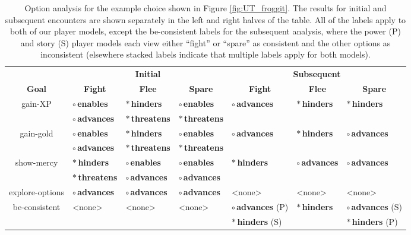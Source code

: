 \documentclass[arts,article,accept,moreauthors,pdftex,10pt,a4paper]{Definitions/mdpi}
\newcommand{\badsym}{$\ast$}
\newcommand{\goodsym}{$\circ$}
\newcommand{\none}{{\sffamily <none>}}
\newcommand{\ncemph}[1]{\textbf{\sffamily #1}}
\newcommand{\enables}{\ncemph{\color{enables}\goodsym{}\,enables}}
\newcommand{\advances}{\ncemph{\color{advances}\goodsym{}\,advances}}
\newcommand{\threatens}{\ncemph{\color{threatens}\badsym{}\,threatens}}
\newcommand{\hinders}{\ncemph{\color{hinders}\badsym{}\,hinders}}
\begin{document}
\begin{table}[t]
\centering
\begin{tabular}{c l l l l l l}
  \toprule
  & \multicolumn{3}{c}{\textbf{Initial}} & \multicolumn{3}{c}{\textbf{Subsequent}} \\
 \cmidrule{1-4} \cmidrule{5-7}
  \textbf{Goal} & \multicolumn{1}{c}{\textbf{Fight}} & \multicolumn{1}{c}{\textbf{Flee}} & \multicolumn{1}{c}{\textbf{Spare}} & \multicolumn{1}{c}{\textbf{Fight}} & \multicolumn{1}{c}{\textbf{Flee}} & \multicolumn{1}{c}{\textbf{Spare}} \\
 \cmidrule{1-4} \cmidrule{5-7}
  \multirow{2}{7em}{\centering gain-XP} & \enables{} & \hinders{} & \enables{} & \multirow{2}{4.6em}{\advances{}} & \multirow{2}{4.6em}{\hinders{}} & \multirow{2}{4.6em}{\hinders{}} \\
                                        & \advances{} & \threatens{} & \threatens{}  \\
  \cmidrule{1-4} \cmidrule{5-7}
  \multirow{2}{7em}{\centering gain-gold} & \enables{} & \hinders{} & \enables{} & \multirow{2}{4.6em}{\advances{}} & \multirow{2}{4.6em}{\hinders{}} & \multirow{2}{4.6em}{\advances{}} \\
                                          & \advances{} & \threatens{} & \threatens{}  \\
 \cmidrule{1-4}\cmidrule{5-7}
  \multirow{2}{7em}{\centering show-mercy} & \hinders{} & \enables{} & \enables{} & \multirow{2}{4.6em}{\hinders{}} & \multirow{2}{4.6em}{\advances{}} & \multirow{2}{4.6em}{\advances{}} \\
                                          & \threatens{} & \advances{} & \advances{} \\
 \cmidrule{1-4} \cmidrule{5-7}
  explore-options & \advances{} & \advances{} & \advances{} & \none{} & \none{} & \none{} \\
 \cmidrule{1-4} \cmidrule{5-7}
  \multirow{2}{7em}{\centering be-consistent} & \multirow{2}{4.6em}{\none{}} & \multirow{2}{4.6em}{\none{}} & \multirow{2}{4.6em}{\none{}} & \advances{} (P) & \multirow{2}{4.6em}{\hinders{}} & \advances{} (S) \\
  & & & & \hinders{} (S) & & \hinders{} (P) \\
  \bottomrule
\end{tabular}
  \caption[\emph{Undertale}option analysis]{Option analysis for the example choice shown in Figure \ref{fig:UT_froggit}. The results for initial and subsequent encounters are shown separately in the left and right halves of the table. All of the labels apply to both of our player models, except the be-consistent labels for the subsequent analysis, where the power (P) and story (S) player models each view either ``fight'' or ``spare'' as consistent and the other options as inconsistent (elsewhere stacked labels indicate that multiple labels apply for both models).}
\label{tab:UT_options}
\end{table}
\end{document}
